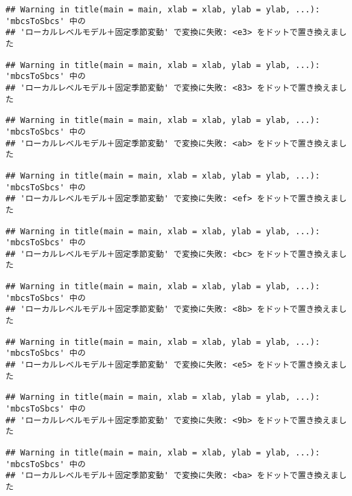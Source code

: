 \documentclass[]{article}
\begin{document}
\begin{verbatim}
## Warning in title(main = main, xlab = xlab, ylab = ylab, ...): 'mbcsToSbcs' 中の
## 'ローカルレベルモデル＋固定季節変動' で変換に失敗: <e3> をドットで置き換えました
\end{verbatim}

\begin{verbatim}
## Warning in title(main = main, xlab = xlab, ylab = ylab, ...): 'mbcsToSbcs' 中の
## 'ローカルレベルモデル＋固定季節変動' で変換に失敗: <83> をドットで置き換えました
\end{verbatim}

\begin{verbatim}
## Warning in title(main = main, xlab = xlab, ylab = ylab, ...): 'mbcsToSbcs' 中の
## 'ローカルレベルモデル＋固定季節変動' で変換に失敗: <ab> をドットで置き換えました
\end{verbatim}

\begin{verbatim}
## Warning in title(main = main, xlab = xlab, ylab = ylab, ...): 'mbcsToSbcs' 中の
## 'ローカルレベルモデル＋固定季節変動' で変換に失敗: <ef> をドットで置き換えました
\end{verbatim}

\begin{verbatim}
## Warning in title(main = main, xlab = xlab, ylab = ylab, ...): 'mbcsToSbcs' 中の
## 'ローカルレベルモデル＋固定季節変動' で変換に失敗: <bc> をドットで置き換えました
\end{verbatim}

\begin{verbatim}
## Warning in title(main = main, xlab = xlab, ylab = ylab, ...): 'mbcsToSbcs' 中の
## 'ローカルレベルモデル＋固定季節変動' で変換に失敗: <8b> をドットで置き換えました
\end{verbatim}

\begin{verbatim}
## Warning in title(main = main, xlab = xlab, ylab = ylab, ...): 'mbcsToSbcs' 中の
## 'ローカルレベルモデル＋固定季節変動' で変換に失敗: <e5> をドットで置き換えました
\end{verbatim}

\begin{verbatim}
## Warning in title(main = main, xlab = xlab, ylab = ylab, ...): 'mbcsToSbcs' 中の
## 'ローカルレベルモデル＋固定季節変動' で変換に失敗: <9b> をドットで置き換えました
\end{verbatim}

\begin{verbatim}
## Warning in title(main = main, xlab = xlab, ylab = ylab, ...): 'mbcsToSbcs' 中の
## 'ローカルレベルモデル＋固定季節変動' で変換に失敗: <ba> をドットで置き換えました
\end{verbatim}
\end{document}
